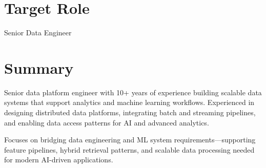 \section*{Target Role}
\begin{center}
	\vspace{-0.4em}
	Senior Data Engineer
\end{center}
\vspace{-1em}


\section*{Summary}
\vspace{-0.3em}

Senior data platform engineer with 10+ years of experience building scalable data systems that support analytics and machine learning workflows. Experienced in designing distributed data platforms, integrating batch and streaming pipelines, and enabling data access patterns for AI and advanced analytics.

Focuses on bridging data engineering and ML system requirements—supporting feature pipelines, hybrid retrieval patterns, and scalable data processing needed for modern AI-driven applications.